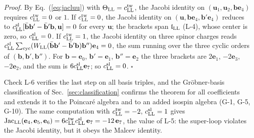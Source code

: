 \noindent\emph{Proof.} By Eq.~(\ref{eq:jacluu}) with $\Theta_{\rm LL}=c^{\rm tw}_{\rm LL}$, the
Jacobi identity on $(\mathbf u_1,\mathbf u_2,\mathbf b\mathbf e_4)$ requires $c^{\rm tw}_{\rm LL}=0$ or
$1$. If $c^{\rm tw}_{\rm LL}=0$, the Jacobi identity on $(\mathbf u,\mathbf b\mathbf e_4,\mathbf b'\mathbf
e_4)$ reduces to $c^{\rm sl}_{\rm LL}[\bar{\mathbf b}\mathbf b'-\bar{\mathbf b}'\mathbf b,\mathbf u]=0$ for
every $\mathbf u$; the brackets span $\mathfrak l_{\rm LL}$ (L-4), whose center is zero, so $c^{\rm
sl}_{\rm LL}=0$. If $c^{\rm tw}_{\rm LL}=1$, the Jacobi identity on three spinor charges reads
$c^{\rm sl}_{\rm LL}\sum_{\rm cyc}(W_{\rm LL}(\bar{\mathbf b}\mathbf b'-\bar{\mathbf b}'\mathbf b)\mathbf
b'')\mathbf e_4=0$, the sum running over the three cyclic orders of $(\mathbf b,\mathbf b',\mathbf b'')$.
For $\mathbf b=\mathbf e_0$, $\mathbf b'=\mathbf e_1$, $\mathbf b''=\mathbf e_2$ the three brackets are
$2\mathbf e_1$, $-2\mathbf e_3$, $-2\mathbf e_2$, and the sum is $6c^{\rm sl}_{\rm LL}\mathbf e_7$; so $c^{\rm
sl}_{\rm LL}=0$. $\square$

Check L-6 verifies the last step on all basis triples, and the Gr\"obner-basis classification of
Sec.~\ref{sec:classification} confirms the theorem for all coefficients and extends it to the
Poincar\'e algebra and to an added isospin algebra (G-1, G-5, G-10). The same computation with
$c^{\rm tw}_{\rm LL}=-2$, $c^{\rm sl}_{\rm LL}=1$ gives $\mathrm{Jac}_{\rm LL}(\mathbf e_4,\mathbf
e_5,\mathbf e_6)=6c^{\rm tw}_{\rm LL}c^{\rm sl}_{\rm LL}\,\mathbf e_7=-12\,\mathbf e_7$, the value of
L-5: the super-loop violates the Jacobi identity, but it obeys the Malcev identity.
